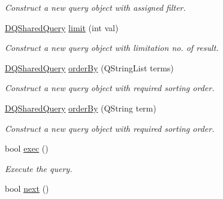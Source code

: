 \begin{DoxyCompactItemize}
\begin{DoxyCompactList}\small\item\em Construct a new query object with assigned filter. \item\end{DoxyCompactList}\item 
\hypertarget{classDQSharedQuery_af1692cc5a046c2061486277f15545af1}{
\hyperlink{classDQSharedQuery}{DQSharedQuery} \hyperlink{classDQSharedQuery_af1692cc5a046c2061486277f15545af1}{limit} (int val)}
\label{classDQSharedQuery_af1692cc5a046c2061486277f15545af1}

\begin{DoxyCompactList}\small\item\em Construct a new query object with limitation no. of result. \item\end{DoxyCompactList}\item 
\hyperlink{classDQSharedQuery}{DQSharedQuery} \hyperlink{classDQSharedQuery_a5bb811ceac95142fb45e2b1b0230fe76}{orderBy} (QStringList terms)
\begin{DoxyCompactList}\small\item\em Construct a new query object with required sorting order. \item\end{DoxyCompactList}\item 
\hyperlink{classDQSharedQuery}{DQSharedQuery} \hyperlink{classDQSharedQuery_aed99232bd84c8871265ab567b5550fe2}{orderBy} (QString term)
\begin{DoxyCompactList}\small\item\em Construct a new query object with required sorting order. \item\end{DoxyCompactList}\item 
\hypertarget{classDQSharedQuery_af9cb13ee212cf95235f982360755c263}{
bool \hyperlink{classDQSharedQuery_af9cb13ee212cf95235f982360755c263}{exec} ()}
\label{classDQSharedQuery_af9cb13ee212cf95235f982360755c263}

\begin{DoxyCompactList}\small\item\em Execute the query. \item\end{DoxyCompactList}\item 
\hypertarget{classDQSharedQuery_a454580a6ba5a8d27690b7cada60cf696}{
bool \hyperlink{classDQSharedQuery_a454580a6ba5a8d27690b7cada60cf696}{next} ()}
\label{classDQSharedQuery_a454580a6ba5a8d27690b7cada60cf696}


\end{DoxyCompactItemize}
